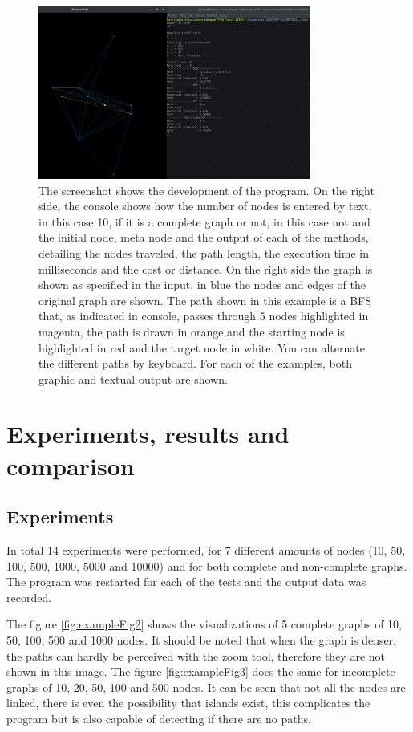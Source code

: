\documentclass[11pt]{article}
\begin{document}
\begin{figure}[ht]
\centering
\includegraphics[width=0.8\textwidth]{Template_SBC/template-latex/screen.png}
\caption{The screenshot shows the development of the program. On the right side, the console shows how the number of nodes is entered by text, in this case 10, if it is a complete graph or not, in this case not and the initial node, meta node and the output of each of the methods, detailing the nodes traveled, the path length, the execution time in milliseconds and the cost or distance. On the right side the graph is shown as specified in the input, in blue the nodes and edges of the original graph are shown. The path shown in this example is a BFS that, as indicated in console, passes through 5 nodes highlighted in magenta, the path is drawn in orange and the starting node is highlighted in red and the target node in white. You can alternate the different paths by keyboard. For each of the examples, both graphic and textual output are shown.}
\label{fig:exampleFig1}
\end{figure}

\section{Experiments, results and comparison}
\subsection{Experiments}
In total 14 experiments were performed, for 7 different amounts of nodes (10, 50, 100, 500, 1000, 5000 and 10000) and for both complete and non-complete graphs. The program was restarted for each of the tests and the output data was recorded.

The figure \ref{fig:exampleFig2} shows the visualizations of 5 complete graphs of 10, 50, 100, 500 and 1000 nodes. It should be noted that when the graph is denser, the paths can hardly be perceived with the zoom tool, therefore they are not shown in this image.
The figure \ref{fig:exampleFig3} does the same for incomplete graphs of 10, 20, 50, 100 and 500 nodes. It can be seen that not all the nodes are linked, there is even the possibility that islands exist, this complicates the program but is also capable of detecting if there are no paths.
\end{document}
